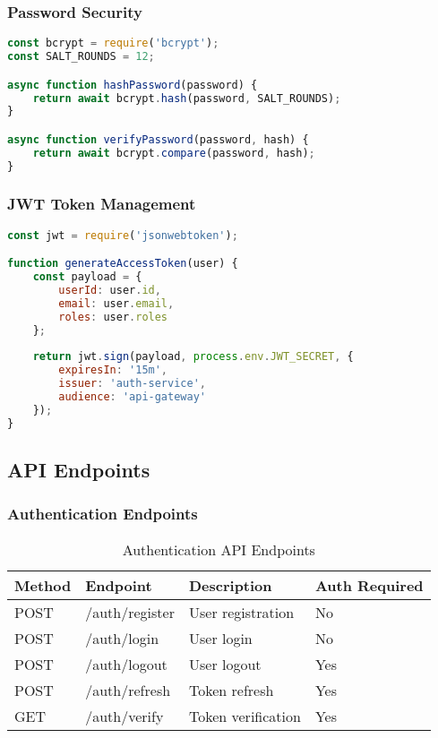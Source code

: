 \documentclass[12pt,a4paper]{article}
\begin{document}
\subsubsection{Password Security}
\begin{lstlisting}[language=JavaScript, caption=Password Hashing Implementation]
const bcrypt = require('bcrypt');
const SALT_ROUNDS = 12;

async function hashPassword(password) {
    return await bcrypt.hash(password, SALT_ROUNDS);
}

async function verifyPassword(password, hash) {
    return await bcrypt.compare(password, hash);
}
\end{lstlisting}

\subsubsection{JWT Token Management}
\begin{lstlisting}[language=JavaScript, caption=JWT Token Generation]
const jwt = require('jsonwebtoken');

function generateAccessToken(user) {
    const payload = {
        userId: user.id,
        email: user.email,
        roles: user.roles
    };
    
    return jwt.sign(payload, process.env.JWT_SECRET, {
        expiresIn: '15m',
        issuer: 'auth-service',
        audience: 'api-gateway'
    });
}
\end{lstlisting}

\subsection{API Endpoints}

\subsubsection{Authentication Endpoints}

\begin{table}[H]
    \centering
    \begin{tabular}{|l|l|l|l|}
        \hline
        \textbf{Method} & \textbf{Endpoint} & \textbf{Description} & \textbf{Auth Required} \\
        \hline
        POST & /auth/register & User registration & No \\
        \hline
        POST & /auth/login & User login & No \\
        \hline
        POST & /auth/logout & User logout & Yes \\
        \hline
        POST & /auth/refresh & Token refresh & Yes \\
        \hline
        GET & /auth/verify & Token verification & Yes \\
        \hline
    \end{tabular}
    \caption{Authentication API Endpoints}
    \label{tab:auth-endpoints}
\end{table}
\end{document}
